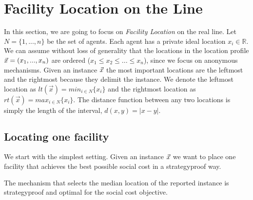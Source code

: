 

\section{Facility Location on the Line}

In this section, we are going to focus on \emph{Facility Location} on the real line. Let $N=\{1,...,n\}$ be the set of agents. Each agent has a private ideal location $x_i\in \mathbb{R}$. We can assume without loss of generality that the locations in the location profile $\vec{x} = (x_1, ..., x_n)$ are ordered ($x_1\le x_2\le...\le x_n$), since we focus on anonymous mechanisms. Given an instance $\vec{x}$ the most important locations are the leftmost and the rightmost because they delimit the instance. We denote the leftmost location as $lt(\vec{x})=min_{i\in N}\{x_i\}$ and the rightmost location as $rt(\vec{x})=max_{i\in N}\{x_i\}$. The distance function between any two locations is simply the length of the interval, $d(x,y) = |x-y|$. 


\subsection{Locating one facility}

We start with the simplest setting. Given an instance $\vec{x}$ we want to place one facility that achieves the best possible social cost in a strategyproof way. 

\begin{theorem}
The mechanism that selects the median location of the reported instance is strategyproof and optimal for the social cost objective.
\end{theorem}

